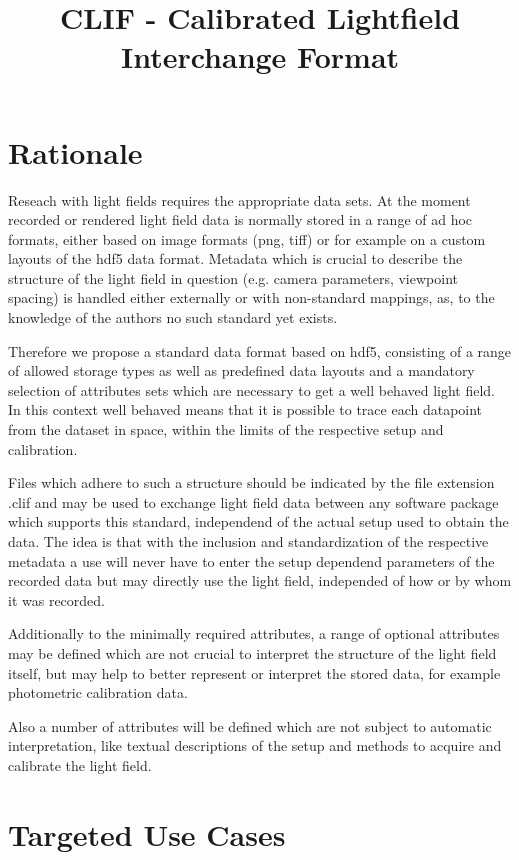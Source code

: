 \documentclass[a4paper,10pt]{article}
\title{CLIF - Calibrated Lightfield Interchange Format}
\author{}
\date{}
\begin{document}
\maketitle

\section{Rationale}

Reseach with light fields requires the appropriate data sets. At the moment recorded or rendered light field data is normally stored in a range of ad hoc formats, either based on image formats (png, tiff) or for example on a custom layouts of the hdf5 data format. Metadata which is crucial to describe the structure of the light field in question (e.g. camera parameters, viewpoint spacing) is handled either externally or with non-standard mappings, as, to the knowledge of the authors no such standard yet exists.

Therefore we propose a standard data format based on hdf5, consisting of a range of allowed storage types as well as predefined data layouts and a mandatory selection of attributes sets which are necessary to get a well behaved light field. In this context well behaved means that it is possible to trace each datapoint from the dataset in space, within the limits of the respective setup and calibration.

Files which adhere to such a structure should be indicated by the file extension .clif and may be used to exchange light field data between any software package which supports this standard, independend of the actual setup used to obtain the data. The idea is that with the inclusion and standardization of the respective metadata a use will never have to enter the setup dependend parameters of the recorded data but may directly use the light field, independed of how or by whom it was recorded.

Additionally to the minimally required attributes, a range of optional attributes may be defined which are not crucial to interpret the structure of the light field itself, but may help to better represent or interpret the stored data, for example photometric calibration data.

Also a number of attributes will be defined which are not subject to automatic interpretation, like textual descriptions of the setup and methods to acquire and calibrate the light field.

\section{Targeted Use Cases}

\section{}
\end{document}
